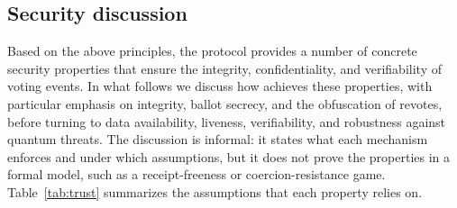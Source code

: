 
\subsection{Security discussion}
\label{sec:analysis:security}

Based on the above principles, the protocol provides a number of concrete security properties that ensure the integrity, confidentiality, and verifiability of voting events. In what follows we discuss how \davinci achieves these properties, with particular emphasis on integrity, ballot secrecy, and the obfuscation of revotes, before turning to data availability, liveness, verifiability, and robustness against quantum threats. The discussion is informal: it states what each mechanism enforces and under which assumptions, but it does not prove the properties in a formal model, such as a receipt-freeness or coercion-resistance game. Table~\ref{tab:trust} summarizes the assumptions that each property relies on.

